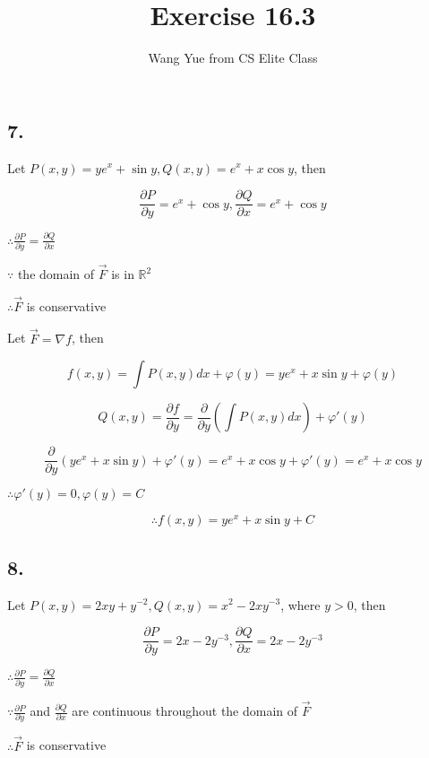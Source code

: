 \documentclass{article}
\begin{document}
  \title{Exercise 16.3}
  \author{Wang Yue from CS Elite Class}
  \maketitle

  \subsection*{7. }

  Let $P(x, y) = ye^x + \sin y, Q(x, y) = e^x + x\cos y$, then

  $$\frac{\partial P}{\partial y} = e^x + \cos y, \frac{\partial Q}{\partial x} = e^x + \cos y$$

  $\therefore \frac{\partial P}{\partial y} = \frac{\partial Q}{\partial x}$

  $\because$ the domain of $\overrightarrow{F}$ is in $\mathbb{R}^2$

  $\therefore \overrightarrow{F}$ is conservative

  Let $\overrightarrow{F} = \nabla f$, then

  $$f(x, y) = \int P(x, y) dx + \varphi(y) = ye^x + x\sin y + \varphi(y)$$

  $$Q(x, y) = \frac{\partial f}{\partial y} = \frac{\partial }{\partial y}(\int P(x, y) dx) + \varphi'(y)$$

  $$\frac{\partial}{\partial y}(ye^x + x\sin y) + \varphi'(y) = e^x + x\cos y + \varphi'(y) = e^x + x\cos y$$

  $\therefore \varphi'(y) = 0, \varphi(y) = C$

  $$\therefore f(x, y) = ye^x + x\sin y + C$$

  \subsection*{8. }

  Let $P(x, y) = 2xy + y^{-2}, Q(x, y) = x^2 - 2xy^{-3}$, where $y > 0$, then

  $$\frac{\partial P}{\partial y} = 2x -2y^{-3}, \frac{\partial Q}{\partial x} = 2x - 2y^{-3}$$

  $\therefore \frac{\partial P}{\partial y} =\frac{\partial Q}{\partial x}$

  $\because \frac{\partial P}{\partial y}$ and $\frac{\partial Q}{\partial x}$ are continuous throughout the domain of $\overrightarrow{F}$

  $\therefore \overrightarrow{F}$ is conservative
\end{document}
